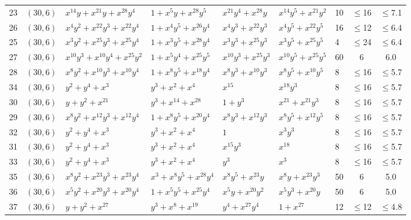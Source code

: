 \begin{table}[t]
\begin{tabular*}{\textwidth}{@{\extracolsep{\fill}}cllllllcc}
23 & $(30,6)$ & $x^{14}y{+}x^{21}y{+}x^{28}y^{4}$ & $1{+}x^{5}y{+}x^{28}y^{5}$ & $x^{21}y^{4}{+}x^{28}y$ & $x^{14}y^{5}{+}x^{21}y^{2}$ & 10 & $\leq$16 & $\leq$7.1 \\
26 & $(30,6)$ & $x^{4}y^{2}{+}x^{22}y^{3}{+}x^{22}y^{4}$ & $1{+}x^{4}y^{5}{+}x^{26}y^{4}$ & $x^{4}y^{3}{+}x^{22}y^{3}$ & $x^{4}y^{5}{+}x^{22}y^{5}$ & 16 & $\leq$12 & $\leq$6.4 \\
25 & $(30,6)$ & $x^{3}y^{2}{+}x^{25}y^{3}{+}x^{25}y^{4}$ & $1{+}x^{3}y^{5}{+}x^{28}y^{4}$ & $x^{3}y^{3}{+}x^{25}y^{3}$ & $x^{3}y^{5}{+}x^{25}y^{5}$ & 4 & $\leq$24 & $\leq$6.4 \\
27 & $(30,6)$ & $x^{10}y^{3}{+}x^{10}y^{4}{+}x^{25}y^{2}$ & $1{+}x^{5}y^{4}{+}x^{25}y^{5}$ & $x^{10}y^{3}{+}x^{25}y^{3}$ & $x^{10}y^{5}{+}x^{25}y^{5}$ & 60 & 6 & 6.0 \\
28 & $(30,6)$ & $x^{8}y^{2}{+}x^{10}y^{3}{+}x^{10}y^{4}$ & $1{+}x^{8}y^{5}{+}x^{18}y^{4}$ & $x^{8}y^{3}{+}x^{10}y^{3}$ & $x^{8}y^{5}{+}x^{10}y^{5}$ & 8 & $\leq$16 & $\leq$5.7 \\
34 & $(30,6)$ & $y^{2}{+}y^{4}{+}x^{3}$ & $y^{3}{+}x^{2}{+}x^{4}$ & $x^{15}$ & $x^{18}y^{3}$ & 8 & $\leq$16 & $\leq$5.7 \\
30 & $(30,6)$ & $y{+}y^{2}{+}x^{21}$ & $y^{3}{+}x^{14}{+}x^{28}$ & $1{+}y^{3}$ & $x^{21}{+}x^{21}y^{3}$ & 8 & $\leq$16 & $\leq$5.7 \\
29 & $(30,6)$ & $x^{8}y^{2}{+}x^{12}y^{3}{+}x^{12}y^{4}$ & $1{+}x^{8}y^{5}{+}x^{20}y^{4}$ & $x^{8}y^{3}{+}x^{12}y^{3}$ & $x^{8}y^{5}{+}x^{12}y^{5}$ & 8 & $\leq$16 & $\leq$5.7 \\
32 & $(30,6)$ & $y^{2}{+}y^{4}{+}x^{3}$ & $y^{3}{+}x^{2}{+}x^{4}$ & $1$ & $x^{3}y^{3}$ & 8 & $\leq$16 & $\leq$5.7 \\
31 & $(30,6)$ & $y^{2}{+}y^{4}{+}x^{3}$ & $y^{3}{+}x^{2}{+}x^{4}$ & $x^{15}y^{3}$ & $x^{18}$ & 8 & $\leq$16 & $\leq$5.7 \\
33 & $(30,6)$ & $y^{2}{+}y^{4}{+}x^{3}$ & $y^{3}{+}x^{2}{+}x^{4}$ & $y^{3}$ & $x^{3}$ & 8 & $\leq$16 & $\leq$5.7 \\
35 & $(30,6)$ & $x^{8}y^{2}{+}x^{23}y^{3}{+}x^{23}y^{4}$ & $x^{3}{+}x^{8}y^{5}{+}x^{28}y^{4}$ & $x^{8}y^{5}{+}x^{23}y$ & $x^{8}y{+}x^{23}y^{3}$ & 50 & 6 & 5.0 \\
36 & $(30,6)$ & $x^{5}y^{2}{+}x^{20}y^{3}{+}x^{20}y^{4}$ & $1{+}x^{5}y^{5}{+}x^{25}y^{4}$ & $x^{5}y{+}x^{20}y^{2}$ & $x^{5}y^{3}{+}x^{20}y$ & 50 & 6 & 5.0 \\
37 & $(30,6)$ & $y{+}y^{2}{+}x^{27}$ & $y^{3}{+}x^{8}{+}x^{19}$ & $y^{4}{+}x^{27}y^{4}$ & $1{+}x^{27}$ & 12 & $\leq$12 & $\leq$4.8 \\

\end{tabular*}
\end{table}
